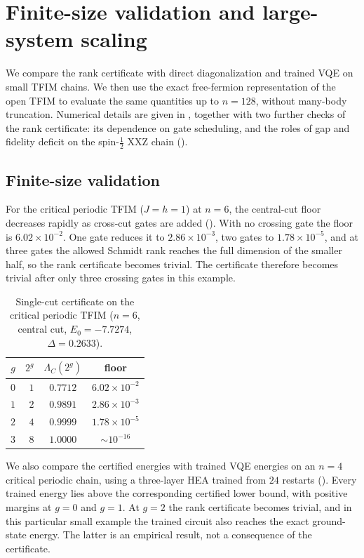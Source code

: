 \documentclass[reprint,aps,pra,floatfix,superscriptaddress,nofootinbib,longbibliography]{revtex4-2}
\theoremstyle{remark}
\theoremstyle{definition}
\begin{document}
\section{Finite-size validation and large-system scaling}

\label{sec:scaling}

We compare the rank certificate with direct diagonalization and trained VQE on
small TFIM chains. We then use the exact free-fermion representation of the
open TFIM to evaluate the same quantities up to $n=128$, without many-body
truncation. Numerical details are given in , together with two
further checks of the rank certificate: its dependence on gate scheduling, and
the roles of gap and fidelity deficit on the spin-$\tfrac12$ XXZ chain
().

\subsection{Finite-size validation}

For the critical periodic TFIM ($J=h=1$) at $n=6$, the central-cut floor
decreases rapidly as cross-cut gates are added (). With no crossing gate the floor is $6.02\times10^{-2}$.
One gate reduces it to $2.86\times10^{-3}$, two gates to $1.78\times10^{-5}$,
and at three gates the allowed Schmidt rank reaches the full dimension of the
smaller half, so the rank certificate becomes trivial. The certificate therefore becomes trivial after only three crossing gates in
this example.

\begin{table}[t]
\centering
\caption{Single-cut certificate on the critical periodic TFIM ($n=6$, central
cut, $E_0=-7.7274$, $\Delta=0.2633$).}
\label{tab:single-cut}
\begin{tabular}{rrcc}
\toprule
$g$ & $2^{g}$ & $\Lambda_C(2^{g})$ & floor\\
\midrule
$0$ & $1$ & $0.7712$ & $6.02\times10^{-2}$\\
$1$ & $2$ & $0.9891$ & $2.86\times10^{-3}$\\
$2$ & $4$ & $0.9999$ & $1.78\times10^{-5}$\\
$3$ & $8$ & $1.0000$ & ${\sim}10^{-16}$\\
\bottomrule
\end{tabular}
\end{table}

We also compare the certified energies with trained VQE energies on an $n=4$
critical periodic chain, using a three-layer HEA trained from $24$ restarts
(). Every trained energy lies above the corresponding
certified lower bound, with positive margins at $g=0$ and $g=1$. At $g=2$ the
rank certificate becomes trivial, and in this particular small example the
trained circuit also reaches the exact ground-state energy. The latter is an
empirical result, not a consequence of the certificate.
\end{document}
